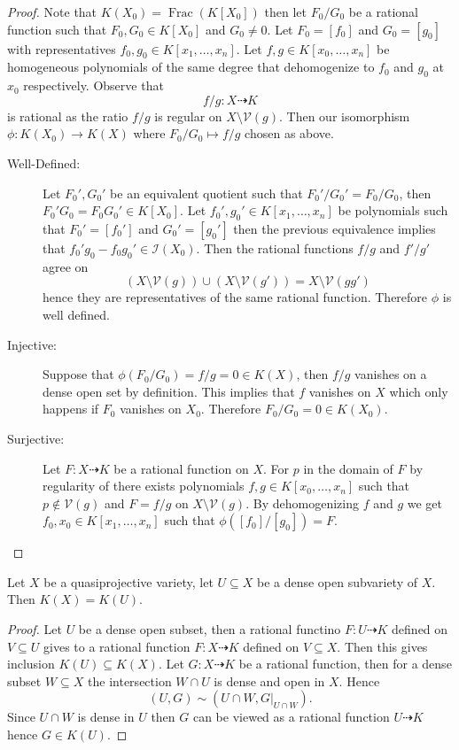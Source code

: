 \documentclass[40pt]{article}
\newcommand{\I}{\mathcal{I}}
\newcommand{\V}{\mathcal{V}}
\newcommand{\todash}{\dashrightarrow}
\DeclareMathOperator{\Frac}{\text{Frac}}
\theoremstyle{remark}
\begin{document}
		\begin{proof}
			Note that $K(X_0) = \Frac(K[X_0])$ then let $F_0/G_0$ be a rational function such that $F_0,G_0 \in K[X_0]$ and $G_0 \neq 0$. Let $F_0 = [f_0]$ and $G_0 = [g_0]$ with representatives $f_0,g_0 \in K[x_1,\dots,x_n]$. Let $f,g \in K[x_0,\dots,x_n]$ be homogeneous polynomials of the same degree that dehomogenize to $f_0$ and $g_0$ at $x_0$ respectively. Observe that 
			\[
			f/g : X \todash K
			\]
			is rational as the ratio $f/g$ is regular on $X\setminus\V(g)$. Then our isomorphism $\phi : K(X_0) \to K(X)$ where $F_0/G_0 \mapsto f/g$ chosen as above. 
			\begin{description}
				\item[Well-Defined:] Let $F_0', G_0'$ be an equivalent quotient such that $F_0'/G_0' = F_0/G_0$, then $F_0'G_0 = F_0G_0' \in K[X_0]$. Let $f_0', g_0' \in K[x_1,\dots,x_n]$ be polynomials such that $F_0' = [f_0']$ and $G_0' = [g_0']$ then the previous equivalence implies that $f_0'g_0 - f_0g_0' \in \I(X_0)$. Then the rational functions $f/g$ and $f'/g'$ agree on 
				\[
				(X \setminus \V(g)) \cup (X \setminus \V(g')) = X \setminus \V(gg')
				\]
				hence they are representatives of the same rational function. Therefore $\phi$ is well defined. 
				\item[Injective:] Suppose that $\phi(F_0/G_0) = f/g = 0 \in K(X)$, then $f/g$ vanishes on a dense open set by definition. This implies that $f$ vanishes on $X$ which only happens if $F_0$ vanishes on $X_0$. Therefore $F_0/G_0 = 0\in K(X_0)$. 
				\item[Surjective:] Let $F: X \todash K$ be a rational function on $X$. For $p$ in the domain of $F$ by regularity of there exists polynomials $f,g \in K[x_0,\dots,x_n]$ such that $p \not \in \V(g)$ and $F = f/g$ on $X \setminus \V(g)$. By dehomogenizing $f$ and $g$ we get $f_0,x_0 \in K[x_1,\dots,x_n]$ such that $\phi([f_0]/[g_0]) = F$. 
			\end{description}
		\end{proof}
		\begin{prop}
			Let $X$ be a quasiprojective variety, let $U\subseteq X$ be a dense open subvariety of $X$. Then $K(X) = K(U)$. 
		\end{prop}
		\begin{proof}
			Let $U$ be a dense open subset, then a rational functino $F : U \todash K$ defined on $V \subseteq U$ gives to a rational function $F :X \todash K$ defined on $V \subseteq X$. Then this gives inclusion $K(U) \subseteq K(X)$. Let $G : X \todash K$ be a rational function, then for a dense subset $W \subseteq X$ the intersection $W \cap U$ is dense and open in $X$. Hence 
			\[
			(U,G) \sim (U \cap W, G|_{U \cap W}).
			\]  
			Since $U \cap W$ is dense in $U$ then $G$ can be viewed as a rational function $U \todash K$ hence $G \in K(U)$.
		\end{proof}
\end{document}

